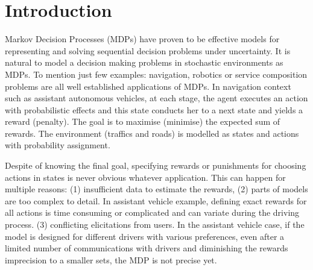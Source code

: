 \documentclass[runningheads,a4paper]{llncs}
\begin{document}
\section{Introduction}



Markov Decision Processes (MDPs) have proven to be effective models for representing and solving sequential decision problems under uncertainty. It is natural to model a decision making problems in stochastic environments as MDPs. To mention just few examples: navigation, robotics or service composition problems are all well established applications of MDPs. In navigation context such as assistant autonomous vehicles, at each stage, the agent executes an action with probabilistic effects and this state conducts her to a next state and yields a reward (penalty). The goal is to maximise (minimise) the expected sum of rewards. The environment %
 (traffics and roads) is modelled as states and actions with probability assignment.%
 
Despite of knowing the final goal, specifying rewards or punishments for choosing actions in states is never obvious whatever application. This can happen for multiple reasons:
(1) insufficient data to estimate the rewards,
(2) parts of models are too complex to detail. In assistant vehicle example, defining exact rewards for all actions is time consuming or complicated and can variate during the driving process. %
(3) conflicting elicitations from users. In the assistant vehicle case, if the model is designed for different drivers with various preferences, even after a limited number of communications with drivers and diminishing the rewards imprecision to a smaller sets, the MDP is not precise yet. 
\end{document}
